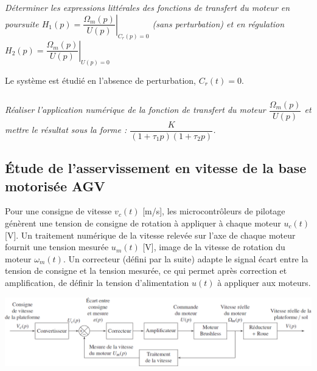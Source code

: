 \begin{multicols}{2}
\begin{multicols}{2}
\subparagraph{}
\textit{Déterminer les expressions littérales des fonctions de transfert du moteur en poursuite $H_1(p)=\left.\dfrac{\Omega_m(p)}{U(p)}\right|_{C_r(p)=0}$ (sans perturbation) et en régulation $H_2(p)=\left.\dfrac{\Omega_m(p)}{U(p)}\right|_{U(p)=0}$}
\ifprof
\begin{corrige}
\end{corrige}
\else
\fi

Le système est étudié en l’absence de perturbation, $C_r(t) = 0$.


\subparagraph{}
\textit{Réaliser l’application numérique de la fonction de transfert du moteur $\dfrac{\Omega_m(p)}{U(p)}$
et mettre le résultat sous la forme : $\dfrac{K}{\left(1+\tau_1 p\right)\left(1+\tau_2 p\right)}$.}
\ifprof
\begin{corrige}
\end{corrige}
\else
\fi
\subsection*{Étude de l’asservissement en vitesse de la base motorisée AGV}

Pour une consigne de vitesse $v_c(t)$ [m/s], les microcontrôleurs de pilotage génèrent une tension de
consigne de rotation à appliquer à chaque moteur $u_c(t)$ [V]. Un traitement numérique de la vitesse
relevée sur l’axe de chaque moteur fournit une tension mesurée $u_m(t)$ [V], image de la vitesse de
rotation du moteur $\omega_m(t)$. Un correcteur (défini par la suite) adapte le signal écart entre la tension de
consigne et la tension mesurée, ce qui permet après correction et amplification, de définir la tension
d’alimentation $u(t)$ à appliquer aux moteurs.


\begin{center}
\includegraphics[width=\linewidth]{images/ccp_08}
\end{center}



\end{multicols}
\end{multicols}
